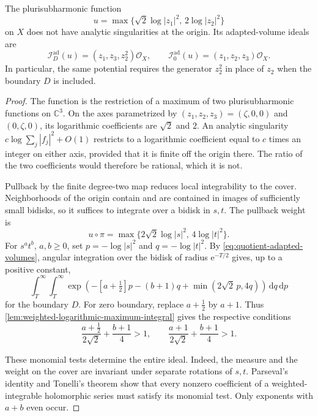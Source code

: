 \begin{proposition}\label{prop:quotient-boundary-ideals}
The plurisubharmonic function
\[
 u=\max\{\sqrt2\log|z_1|^2,\,2\log|z_2|^2\}
\]
on $X$ does not have analytic singularities at the origin. Its adapted-volume ideals are
\[
 \mathcal I_D^{\mathrm{ad}}(u)=(z_1,z_3,z_2^2)\mathcal O_X,
 \qquad
 \mathcal I_0^{\mathrm{ad}}(u)=(z_1,z_2,z_3)\mathcal O_X.
\]
In particular, the same potential requires the generator $z_2^2$ in place of $z_2$ when the boundary $D$ is included.
\end{proposition}
\begin{proof}
The function is the restriction of a maximum of two plurisubharmonic functions on $\mathbb C^3$. On the axes parametrized by $(z_1,z_2,z_3)=(\zeta,0,0)$ and $(0,\zeta,0)$, its logarithmic coefficients are $\sqrt2$ and $2$. An analytic singularity $c\log\sum_j|f_j|^2+O(1)$ restricts to a logarithmic coefficient equal to $c$ times an integer on either axis, provided that it is finite off the origin there. The ratio of the two coefficients would therefore be rational, which it is not.

Pullback by the finite degree-two map reduces local integrability to the cover. Neighborhoods of the origin contain and are contained in images of sufficiently small bidisks, so it suffices to integrate over a bidisk in $s,t$. The pullback weight is
\[
 u\circ\pi=\max\{2\sqrt2\log|s|^2,\,4\log|t|^2\}.
\]
For $s^at^b$, $a,b\geq0$, set $p=-\log|s|^2$ and $q=-\log|t|^2$. By \eqref{eq:quotient-adapted-volumes}, angular integration over the bidisk of radius $\mathrm e^{-T/2}$ gives, up to a positive constant,
\[
 \int_T^\infty\int_T^\infty
  \exp\left(-\left[a+\tfrac12\right]p-(b+1)q
             +\min(2\sqrt2\,p,4q)\right)
       \,\mathrm{d}q\,\mathrm{d}p
\]
for the boundary $D$. For zero boundary, replace $a+\tfrac12$ by $a+1$. Thus \cref{lem:weighted-logarithmic-maximum-integral} gives the respective conditions
\begin{equation}\label{eq:quotient-monomial-tests}
 \frac{a+\tfrac12}{2\sqrt2}+\frac{b+1}{4}>1,
 \qquad
 \frac{a+1}{2\sqrt2}+\frac{b+1}{4}>1.
\end{equation}

These monomial tests determine the entire ideal. Indeed, the measure and the weight on the cover are invariant under separate rotations of $s,t$. Parseval's identity and Tonelli's theorem show that every nonzero coefficient of a weighted-integrable holomorphic series must satisfy its monomial test. Only exponents with $a+b$ even occur.


\end{proof}
